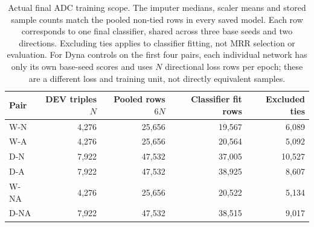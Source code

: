 \begin{table}[htbp]
\centering\footnotesize\setlength{\tabcolsep}{5pt}
\caption{Actual final ADC training scope. The imputer medians, scaler means and stored sample counts match the pooled non-tied rows in every saved model. Each row corresponds to one final classifier, shared across three base seeds and two directions. Excluding ties applies to classifier fitting, not MRR selection or evaluation. For Dyna controls on the first four pairs, each individual network has only its own base-seed scores and uses $N$ directional loss rows per epoch; these are a different loss and training unit, not directly equivalent samples.}
\label{tab:inference-fit-counts}
\begin{tabular}{lrrrr}
\toprule Pair & DEV triples $N$ & Pooled rows $6N$ & Classifier fit rows & Excluded ties \\
\midrule
W-N & 4,276 & 25,656 & 19,567 & 6,089\\
W-A & 4,276 & 25,656 & 20,564 & 5,092\\
D-N & 7,922 & 47,532 & 37,005 & 10,527\\
D-A & 7,922 & 47,532 & 38,925 & 8,607\\
W-NA & 4,276 & 25,656 & 20,522 & 5,134\\
D-NA & 7,922 & 47,532 & 38,515 & 9,017\\
\bottomrule
\end{tabular}
\end{table}
